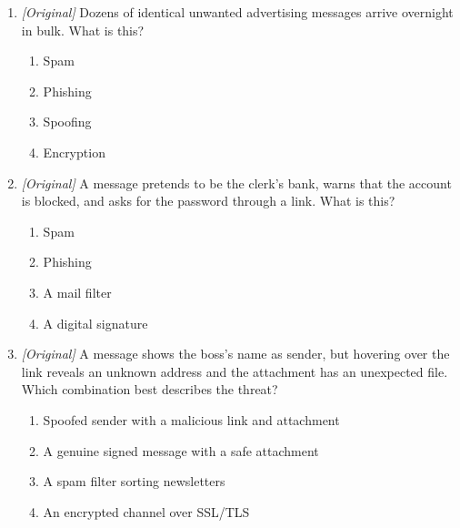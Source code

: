 \begin{enumerate}[label=\textbf{Q\arabic*.}, leftmargin=*]
\begin{enumerate}[label=\Alph*.]
    \item SSL/TLS
    \item POP3/IMAP
    \item BCC/Cc
    \item Filters/rules
  \end{enumerate}
\item \textit{[Original]} Dozens of identical unwanted advertising messages
  arrive overnight in bulk. What is this?
  \begin{enumerate}[label=\Alph*.]
    \item Spam
    \item Phishing
    \item Spoofing
    \item Encryption
  \end{enumerate}
\item \textit{[Original]} A message pretends to be the clerk's bank, warns
  that the account is blocked, and asks for the password through a link.
  What is this?
  \begin{enumerate}[label=\Alph*.]
    \item Spam
    \item Phishing
    \item A mail filter
    \item A digital signature
  \end{enumerate}
\item \textit{[Original]} A message shows the boss's name as sender, but
  hovering over the link reveals an unknown address and the attachment has
  an unexpected file. Which combination best describes the threat?
  \begin{enumerate}[label=\Alph*.]
    \item Spoofed sender with a malicious link and attachment
    \item A genuine signed message with a safe attachment
    \item A spam filter sorting newsletters
    \item An encrypted channel over SSL/TLS
  \end{enumerate}


\end{enumerate}
